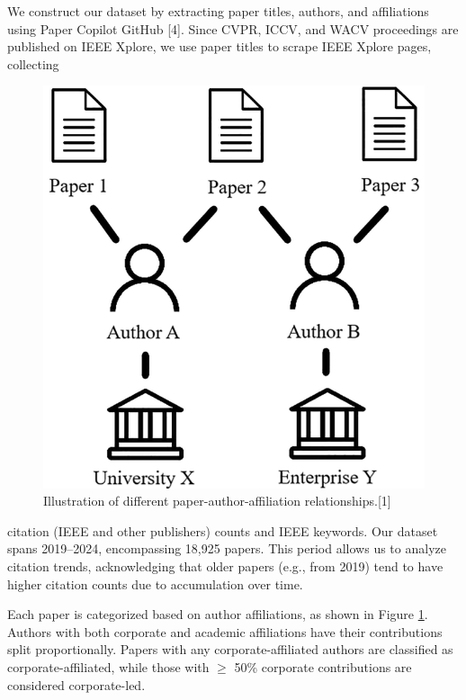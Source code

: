 \documentclass{article}
\begin{document}
We construct our dataset by extracting paper titles, authors, and affiliations using Paper Copilot GitHub [4]. Since CVPR, ICCV, and WACV proceedings are published on IEEE Xplore, we use paper titles to scrape IEEE Xplore pages, collecting 
\begin{figure}
\centering
\includegraphics[width=.95\linewidth]{report/images/affiliation-combination.png}
\caption{Illustration of different paper-author-affiliation relationships.[1] }
\label{fig:affiliation-combination}
\vspace{-20pt}
\end{figure}
citation (IEEE  and other publishers) counts and IEEE keywords. Our dataset spans 2019–2024, encompassing 18,925 papers. This period allows us to analyze citation trends, acknowledging that older papers (e.g., from 2019) tend to have higher citation counts due to accumulation over time.

Each paper is categorized based on author affiliations, as shown in Figure \ref{fig:affiliation-combination}. Authors with both corporate and academic affiliations have their contributions split proportionally. Papers with any corporate-affiliated authors are classified as corporate-affiliated, while those with $\geq$ 50\% corporate contributions are considered corporate-led.
\end{document}
